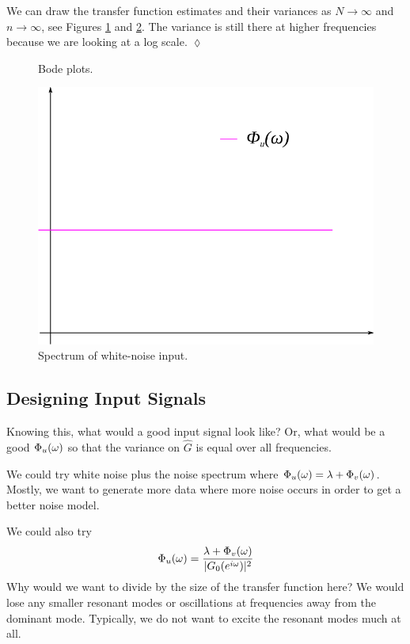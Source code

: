 \begin{example}
We can draw the transfer function estimates and their variances as $N\to\infty$ and $n\to\infty$, see Figures \ref{fig:15tf} and \ref{fig:15phi}. The variance is still there at higher frequencies because we are looking at a log scale.
$\lozenge$
\end{example}

\begin{figure}[ht!]
	\centering
	 \hfill
	\caption{Bode plots.}
	\label{fig:15tf}
\end{figure}

\begin{figure}[ht!]
	\centering
	\includegraphics[width=.15\textwidth]{images/15phi}
	\caption{Spectrum of white-noise input.}
	\label{fig:15phi}
\end{figure}

\subsection{Designing Input Signals}
Knowing this, what would a good input signal look like? Or, what would be a good $\Phi_u(\omega)$ so that the variance on $\hat{G}$ is equal over all frequencies.

We could try white noise plus the noise spectrum where $\Phi_u(\omega)=\lambda+\Phi_v(\omega)$. Mostly, we want to generate more data where more noise occurs in order to get a better noise model.

We could also try
$$\Phi_u(\omega) = \frac{\lambda+\Phi_v(\omega)}{|G_0(e^{i\omega})|^2}$$
Why would we want to divide by the size of the transfer function here? We would lose any smaller resonant modes or oscillations at frequencies away from the dominant mode. Typically, we do not want to excite the resonant modes much at all.


